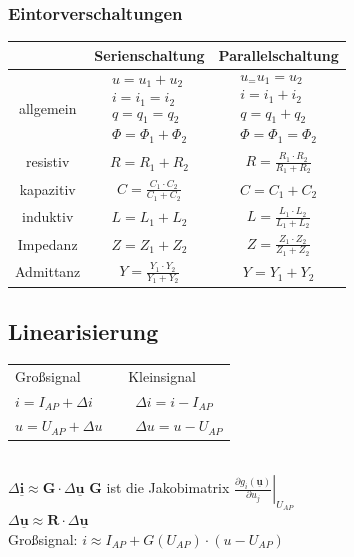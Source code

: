 \documentclass[6pt,a4paper]{scrartcl}
\newcommand{\ma}[1]{\ensuremath{{\boldsymbol {#1}}}}
\renewcommand{\vec}[1]{\ensuremath{\underline{\boldsymbol {#1}}}}
\begin{document}
\begin{multicols}{4}
	\subsubsection{Eintorverschaltungen}
	\begin{tabular}{c||c|c}
		& \large{Serienschaltung} & \large{Parallelschaltung} \\ \hline \hline
		allgemein & $\begin{array}{l} u=u_1+u_2 \\ i=i_1 = i_2 \\ q=q_1=q_2 \\ \Phi=\Phi_1 + \Phi_2  \end{array}$ & $\begin{array}{l} u_=u_1=u_2 \\ i=i_1+i_2 \\ q=q_1+q_2 \\ \Phi=\Phi_1 = \Phi_2 \end{array}$ \\ \hline
		resistiv & $R=R_1 + R_2$ & $R = \frac{R_1 \cdot R_2}{R_1 + R_2}$ \\
		kapazitiv & $C=\frac{C_1 \cdot C_2}{C_1 + C_2}$ & $C=C_1 + C_2$\\
		induktiv & $L=L_1 + L_2$ & $L=\frac{L_1 \cdot L_2}{L_1 + L_2}$ \\[0.5em]
		Impedanz & $Z=Z_1 + Z_2$ & $Z = \frac{Z_1 \cdot Z_2}{Z_1 + Z_2}$\\
		Admittanz & $Y=\frac{Y_1 \cdot Y_2}{Y_1 + Y_2}$ & $Y=Y_1 + Y_2$\\
	\end{tabular}


	\subsection{Linearisierung}
	\begin{tabular}{ll}
		Großsignal & Kleinsignal\\
		$i=I_{AP}+\Delta i$ \ &  \ $\Delta i= i - I_{AP}$\\
		$u=U_{AP}+\Delta u$ \ &  \ $\Delta u= u - U_{AP}$\\
	\end{tabular}
	\\
	$\Delta \vec i \approx \ma G \cdot \Delta \vec u$ \qquad $\ma G$ ist die Jakobimatrix $\left. \frac{\partial g_i(\vec u)}{\partial u_j} \right|_{U_{AP}}$\\
	$\Delta \vec u \approx \ma R \cdot \Delta \vec u$\\	
	Großsignal: $i \approx I_{AP} + G(U_{AP}) \cdot (u - U_{AP})$\\



\end{multicols}
\end{document}
